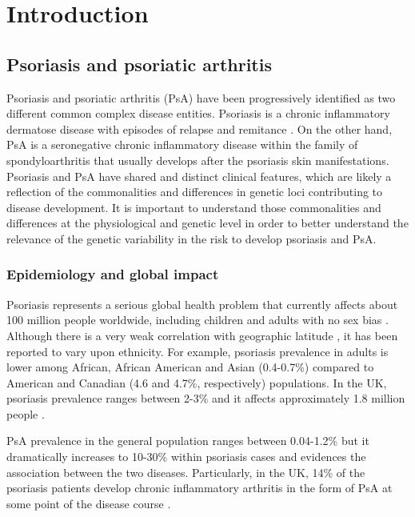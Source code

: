 \chapter{Introduction}
\label{ch:Intro}




\section{Psoriasis and psoriatic arthritis}
%
Psoriasis and psoriatic arthritis (PsA) have been progressively identified as two different common complex disease entities. Psoriasis is a chronic inflammatory dermatose disease with episodes of relapse and remitance \parencite{Nestle2009}. On the other hand, PsA is a seronegative chronic inflammatory disease within the family of spondyloarthritis \parencite{Moll1973, Coates2016} that usually develops after the psoriasis skin manifestations\parencite{Villanova2016}. Psoriasis and PsA have shared and distinct clinical features, which are likely a reflection of the commonalities and differences in genetic loci contributing to disease development. It is important to understand those commonalities and differences at the physiological and genetic level in order to better understand the relevance of the genetic variability in the risk to develop psoriasis and PsA.


\subsection{Epidemiology and global impact}
%
Psoriasis represents a serious global health problem that currently affects about 100 million people worldwide, including children and adults with no sex bias \parencite{Organization2016}. Although there is a very weak correlation with geographic latitude \parencite{Jacobson2011}, it has been reported to vary upon ethnicity. For example, psoriasis prevalence in adults is lower among African, African American and Asian (0.4-0.7\%) compared to American and Canadian (4.6 and 4.7\%, respectively) populations. In the UK, psoriasis prevalence ranges between 2-3\% and it affects approximately 1.8 million people \parencite{Perera2012}.

PsA prevalence in the general population ranges between 0.04-1.2\% \parencite{Perera2012}but it dramatically increases to 10-30\% within psoriasis cases \parencite{Gelfand2005,Reich2008} and evidences the association between the two diseases. Particularly, in the UK, 14\% of the psoriasis patients develop chronic inflammatory arthritis in the form of PsA at some point of the disease course \parencite{Ibrahim2009}. %

